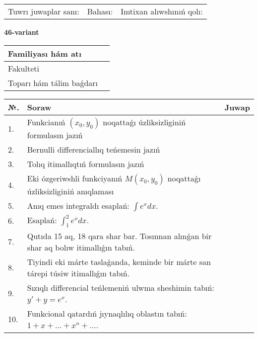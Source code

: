 \documentclass{article}
\begin{document}
\vspace{1cm}

\begin{tabular}{ c c c }
Tuwrı juwaplar sanı: \underline{\hspace{2cm}} & Bahası: \underline{\hspace{2cm}} & Imtixan alıwshınıń qolı: \underline{\hspace{2cm}} \\
\end{tabular}

\newpage

\begin{center}\textbf{46-variant}\end{center}

\bgroup
\def\arraystretch{1.5}
\begin{tabular}{ |m{6cm}|m{10cm}| }
  \hline
  Familiyası hám atı & \\
  \hline
  Fakulteti &\\
  \hline
  Toparı hám tálim baǵdarı & \\
  \hline
\end{tabular}
\egroup

\vspace{0.5cm}

\bgroup
\def\arraystretch{2}
\begin{tabular}{ |l|m{8cm}|m{7cm}| }
  \hline
  №. & Soraw & Juwap \\
  \hline
  1. & Funkcianıń $(x_{0}, y_{0})$ noqattaǵı úzliksizliginiń formulasın jazıń &  \\
  \hline
  2. & Bernulli differenciallıq teńemesin jazıń &  \\
  \hline
  3. & Tolıq itimallıqtıń formulasın jazıń &  \\
  \hline
  4. & Eki ózgeriwshli funkciyanıń $M(x_{0} , y_{0})$ noqattaǵı úzliksizliginiń anıqlaması &  \\
  \hline
  5. & Anıq emes integraldı esaplań: $\displaystyle\int e^{x}dx$. &  \\
  \hline
  6. & Esaplań: $\displaystyle\int_{1}^{2}{e^{x}dx}$. &  \\
  \hline
  7. & Qutıda 15 aq, 18 qara shar bar. Tosınnan alınǵan bir shar aq bolıw itimallıǵın tabıń. &  \\
  \hline
  8. & Tiyindi eki márte taslaǵanda, keminde bir márte san tárepi túsiw itimallıǵın tabıń. &  \\
  \hline
  9. & Sızıqlı differencial teńlemeniń ulwma sheshimin tabıń: $y' + y =e^{x}$. &  \\
  \hline
  10. & Funkcional qatardıń jıynaqlılıq oblastın tabıń: $1 + x + \ldots + x^{n} + \ldots$. &  \\
  \hline
\end{tabular}
\egroup
\end{document}
